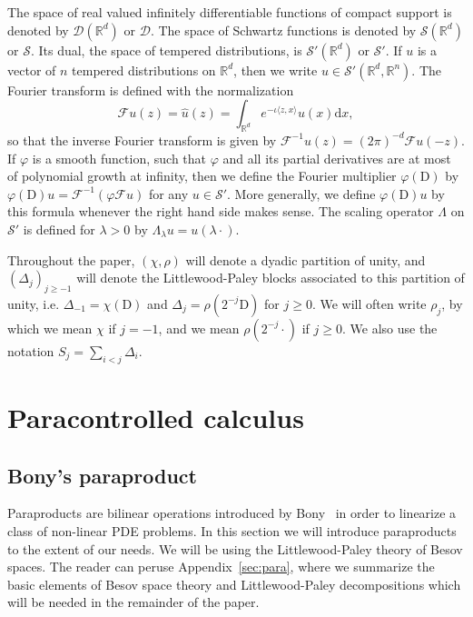 \documentclass[11pt,a4paper]{article}
\newcommand{\mathD}{\mathrm{D}}
\newcommand{\mathd}{\mathrm{d}}
\theoremstyle{remark}
\newcommand{\CD}{\ensuremath{\mathscr{D}}}
\newcommand{\CF}{\ensuremath{\mathscr{F}}}
\newcommand{\CS}{\ensuremath{\mathscr{S}}}
\begin{document}
The space of real valued infinitely differentiable functions of compact support is denoted by $\CD ( \mathbb{R}^{d} )$ or $\CD$. The space of Schwartz functions is denoted by $\CS ( \mathbb{R}^{d} )$ or $\CS$. Its dual, the space of tempered distributions, is $\CS' ( \mathbb{R}^{d} )$ or $\CS'$. If $u$ is a vector of $n$ tempered distributions on $\mathbb{R}^{d}$, then we write $u \in \CS' (\mathbb{R}^{d} ,\mathbb{R}^{n} )$. The Fourier transform is defined with the normalization
\[
   \CF u ( z ) = \hat{u} ( z ) = \int_{\mathbb{R}^{d}} e^{- \iota \langle z,x \rangle} u ( x ) \mathd x,
\]
so that the inverse Fourier transform is given by $\CF^{-1} u ( z ) = ( 2 \pi)^{-d} \CF u ( -z )$. If $\varphi$ is a smooth function, such that $\varphi$ and all its partial derivatives are at most of polynomial growth at infinity, then we define the Fourier multiplier $\varphi ( \mathD )$ by $\varphi (\mathD ) u= \CF^{-1} ( \varphi \CF u)$ for any $u \in \CS'$. More generally, we define $\varphi ( \mathD ) u$ by this formula whenever the right hand side makes sense. The scaling operator $\Lambda$ on $\CS'$ is defined for $\lambda >0$ by $\Lambda_\lambda u = u(\lambda\cdot)$.

Throughout the paper, $(\chi, \rho)$ will denote a dyadic partition of unity, and $(\Delta_j)_{j \ge -1}$ will denote the Littlewood-Paley blocks associated to this partition of unity, i.e. $\Delta_{-1}= \chi(\mathD)$ and $\Delta_j = \rho(2^{-j} \mathD)$ for $j \ge 0$. We will often write $\rho_j$, by which we mean $\chi$ if $j=-1$, and we mean $\rho(2^{-j} \cdot)$ if $j \ge 0$. We also use the notation $S_j = \sum_{i < j} \Delta_i$.


\section{Paracontrolled calculus}\label{sec:paracontrolled}


\subsection{Bony's paraproduct}\label{sec:bony}

Paraproducts are bilinear operations introduced by Bony~\cite{Bony1981} in order to linearize a class of non-linear PDE problems. In this section we will introduce paraproducts to the extent of our needs. We will be using the Littlewood-Paley theory of Besov spaces. The reader can peruse Appendix~\ref{sec:para}, where we summarize the basic elements of Besov space theory and Littlewood-Paley decompositions which will be needed in the remainder of the paper.
\end{document}

